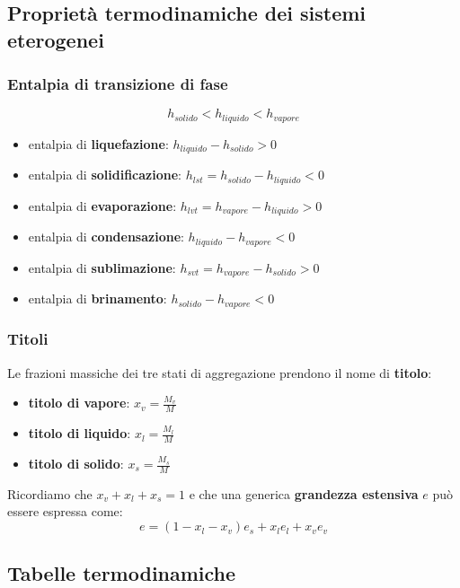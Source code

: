 \subsection{Proprietà termodinamiche dei sistemi eterogenei}
\subsubsection{Entalpia di transizione di fase}
\[
    h_{solido} < h_{liquido} < h_{vapore}
\]
\begin{itemize}
    \item entalpia di \textbf{liquefazione}: $h_{liquido}-h_{solido} > 0$
    \item entalpia di \textbf{solidificazione}: $h_{lst}= h_{solido}- h_{liquido} < 0$
    \item entalpia di \textbf{evaporazione}: $h_{lvt} = h_{vapore}- h_{liquido} >0$
    \item entalpia di \textbf{condensazione}: $h_{liquido}-h_{vapore} <0$
    \item entalpia di \textbf{sublimazione}: $h_{svt} = h_{vapore}- h_{solido} >0$
    \item entalpia di \textbf{brinamento}: $h_{solido}-h_{vapore} <0$
\end{itemize}
\subsubsection{Titoli}
Le frazioni massiche dei tre stati di aggregazione prendono il nome di \textbf{titolo}:
\begin{itemize}
    \item \textbf{titolo di vapore}: $x_v = \frac{M_v}{M}$
    \item \textbf{titolo di liquido}: $x_l = \frac{M_l}{M}$
    \item \textbf{titolo di solido}: $x_s = \frac{M_s}{M}$
\end{itemize}
Ricordiamo che $x_v + x_l + x_s = 1$ e che una generica \textbf{grandezza estensiva} $e$ può essere espressa come:
\[
    e = (1-x_l-x_v) e_s + x_l e_l + x_v e_v
\]
\subsection{Tabelle termodinamiche}
